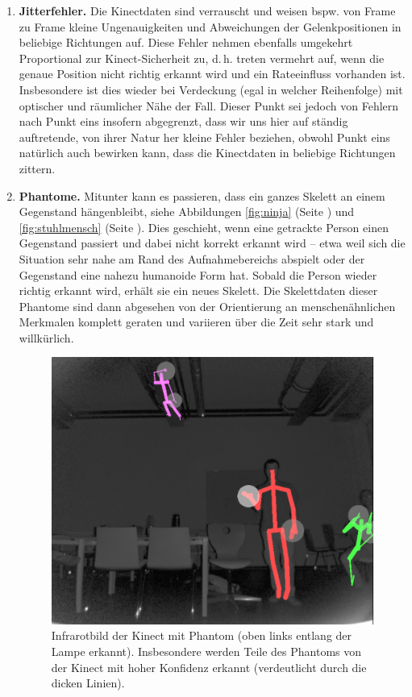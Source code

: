 \begin{enumerate}[label=(\roman*)]
		\item\label{itm:problem3} \textbf{Jitterfehler.} Die Kinectdaten sind verrauscht und weisen bspw. von Frame zu Frame kleine Ungenauigkeiten und Abweichungen der Gelenkpositionen in beliebige Richtungen auf. Diese Fehler nehmen ebenfalls umgekehrt Proportional zur Kinect-Sicherheit zu, d.\,h. treten vermehrt auf, wenn die genaue Position nicht richtig erkannt wird und ein \glqq Rateeinfluss\grqq{} vorhanden ist. Insbesondere ist dies wieder bei Verdeckung (egal in welcher Reihenfolge) mit optischer und räumlicher Nähe der Fall. Dieser Punkt sei jedoch von Fehlern nach Punkt eins insofern abgegrenzt, dass wir uns hier auf ständig auftretende, von ihrer Natur her kleine Fehler beziehen, obwohl Punkt eins natürlich auch bewirken kann, dass die Kinectdaten in beliebige Richtungen \glqq zittern\grqq{}.
		\item\label{itm:problem4} \textbf{Phantome.} Mitunter kann es passieren, dass ein ganzes Skelett an einem Gegenstand hängenbleibt, siehe Abbildungen \ref{fig:ninja} (Seite \pageref{fig:ninja}) und \ref{fig:stuhlmensch} (Seite \pageref{fig:stuhlmensch}). Dies geschieht, wenn eine getrackte Person einen Gegenstand passiert und dabei nicht korrekt erkannt wird -- etwa weil sich die Situation sehr nahe am Rand des Aufnahmebereichs abspielt oder der Gegenstand eine nahezu humanoide Form hat. Sobald die Person wieder richtig erkannt wird, erhält sie ein neues Skelett. Die Skelettdaten dieser Phantome sind dann abgesehen von der Orientierung an menschenähnlichen Merkmalen komplett geraten und variieren über die Zeit sehr stark und willkürlich.\par
	\begin{figure}
	\centering
	\includegraphics[width=.7\textwidth]{pictures/ninja.png}
	\caption{Infrarotbild der Kinect mit Phantom (oben links entlang der Lampe erkannt). Insbesondere werden Teile des Phantoms von der Kinect mit hoher Konfidenz erkannt (verdeutlicht durch die dicken Linien).\\
}
\end{figure}
\end{enumerate}
